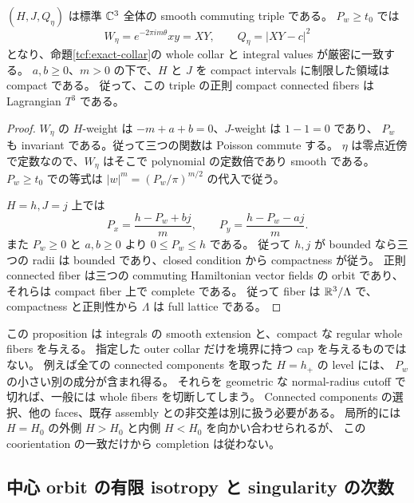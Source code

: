 \begin{proposition}
\label{tcf:extension}
$(H,J,Q_\eta)$ は標準 $\mathbb C^3$ 全体の smooth commuting triple である。
$P_w\ge t_0$ では
\[
 W_\eta=e^{-2\pi im\theta}xy=XY,
 \qquad Q_\eta=|XY-c|^2
\]
となり、命題\ref{tcf:exact-collar}の whole collar と integral values が厳密に一致する。
$a,b\ge0$、$m>0$ の下で、$H$ と $J$ を compact intervals に制限した領域は compact である。
従って、この triple の正則 compact connected fibers は Lagrangian $T^3$ である。
\end{proposition}

\begin{proof}
$W_\eta$ の $H$-weight は $-m+a+b=0$、$J$-weight は $1-1=0$ であり、
$P_w$ も invariant である。従って三つの関数は Poisson commute する。
$\eta$ は零点近傍で定数なので、$W_\eta$ はそこで polynomial の定数倍であり smooth である。
$P_w\ge t_0$ での等式は $|w|^m=(P_w/\pi)^{m/2}$ の代入で従う。

$H=h,J=j$ 上では
\begin{equation}\label{tcf:reduced-radii}
 P_x=\frac{h-P_w+bj}{m},\qquad
 P_y=\frac{h-P_w-aj}{m}.
\end{equation}
また $P_w\ge0$ と $a,b\ge0$ より $0\le P_w\le h$ である。
従って $h,j$ が bounded なら三つの radii は bounded であり、closed condition から compactness が従う。
正則 connected fiber は三つの commuting Hamiltonian vector fields の orbit であり、
それらは compact fiber 上で complete である。
従って fiber は $\mathbb R^3/\Lambda$ で、compactness と正則性から $\Lambda$ は full lattice である。
\end{proof}

この proposition は integrals の smooth extension と、compact な regular whole fibers を与える。
指定した outer collar だけを境界に持つ cap を与えるものではない。
例えば全ての connected components を取った $H=h_+$ の level には、
$P_w$ の小さい別の成分が含まれ得る。
それらを geometric な normal-radius cutoff で切れば、一般には whole fibers を切断してしまう。
Connected components の選択、他の faces、既存 assembly との非交差は別に扱う必要がある。
局所的には $H=H_0$ の外側 $H>H_0$ と内側 $H<H_0$ を向かい合わせられるが、
この coorientation の一致だけから completion は従わない。

\subsection{中心 orbit の有限 isotropy と singularity の次数}

